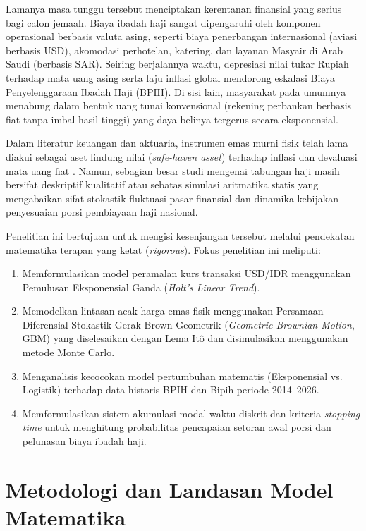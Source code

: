 \documentclass[journal,twoside]{IEEEtran}
\begin{document}
Lamanya masa tunggu tersebut menciptakan kerentanan finansial yang serius bagi calon jemaah. Biaya ibadah haji sangat dipengaruhi oleh komponen operasional berbasis valuta asing, seperti biaya penerbangan internasional (aviasi berbasis USD), akomodasi perhotelan, katering, dan layanan Masyair di Arab Saudi (berbasis SAR). Seiring berjalannya waktu, depresiasi nilai tukar Rupiah terhadap mata uang asing serta laju inflasi global mendorong eskalasi Biaya Penyelenggaraan Ibadah Haji (BPIH). Di sisi lain, masyarakat pada umumnya menabung dalam bentuk uang tunai konvensional (rekening perbankan berbasis fiat tanpa imbal hasil tinggi) yang daya belinya tergerus secara eksponensial.

Dalam literatur keuangan dan aktuaria, instrumen emas murni fisik telah lama diakui sebagai aset lindung nilai (\textit{safe-haven asset}) terhadap inflasi dan devaluasi mata uang fiat \cite{hull2003options}. Namun, sebagian besar studi mengenai tabungan haji masih bersifat deskriptif kualitatif atau sebatas simulasi aritmatika statis yang mengabaikan sifat stokastik fluktuasi pasar finansial dan dinamika kebijakan penyesuaian porsi pembiayaan haji nasional.

Penelitian ini bertujuan untuk mengisi kesenjangan tersebut melalui pendekatan matematika terapan yang ketat (\textit{rigorous}). Fokus penelitian ini meliputi:
\begin{enumerate}
    \item Memformulasikan model peramalan kurs transaksi USD/IDR menggunakan Pemulusan Eksponensial Ganda (\textit{Holt's Linear Trend}).
    \item Memodelkan lintasan acak harga emas fisik menggunakan Persamaan Diferensial Stokastik Gerak Brown Geometrik (\textit{Geometric Brownian Motion}, GBM) yang diselesaikan dengan Lema It\^o dan disimulasikan menggunakan metode Monte Carlo.
    \item Menganalisis kecocokan model pertumbuhan matematis (Eksponensial vs. Logistik) terhadap data historis BPIH dan Bipih periode 2014--2026.
    \item Memformulasikan sistem akumulasi modal waktu diskrit dan kriteria \textit{stopping time} untuk menghitung probabilitas pencapaian setoran awal porsi dan pelunasan biaya ibadah haji.
\end{enumerate}

\section{Metodologi dan Landasan Model Matematika}
\end{document}
